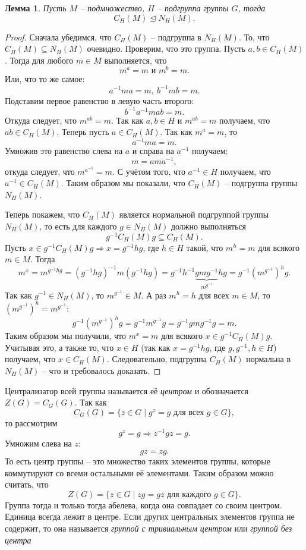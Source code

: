 \documentclass{article}
\newtheorem{lemma}{Лемма}[section]
\begin{document}
\begin{lemma} \label{vweqwqw}
    Пусть $M$ -- подмножество, $H$ -- подгруппа группы $G$, тогда $$ C_H(M) \trianglelefteq N_H(M). $$
\end{lemma}
\begin{proof}
    Сначала убедимся, что $C_H(M)$ -- подгруппа в $N_H(M)$. То, что $C_H(M) \subseteq N_H(M)$ очевидно. Проверим, что это группа. Пусть $a, b \in C_H(M)$. Тогда для любого $m \in M$ выполняется, что $$ m^a = m \text{ и } m^b = m. $$ Или, что то же самое: $$ a^{-1} m a = m, \ b^{-1} m b = m. $$ Подставим первое равенство в левую часть второго: $$ b^{-1} a^{-1} m a b = m. $$ Откуда следует, что $m^{ab} = m$. Так как $a,b \in H$ и $m^{ab} = m$ получаем, что $ab \in C_H(M)$.
    Теперь пусть $a \in C_H(M)$. Так как $m^a = m$, то $$ a^{-1} m a = m. $$ Умножив это равенство слева на $a$ и справа на $a^{-1}$ получаем: $$ m = a m a^{-1}, $$ откуда следует, что $m^{a^{-1}} = m$. С учётом того, что $a^{-1} \in H$ получаем, что $a^{-1} \in C_H(M)$. Таким образом мы показали, что $C_H(M)$ -- подгруппа группы $N_H(M)$.

    Теперь покажем, что $C_H(M)$ является нормальной подгруппой группы $N_H(M)$, то есть для каждого $g \in N_H(M)$ должно выполняться $$ g^{-1} C_H(M) g \subseteq C_H(M). $$ Пусть $x \in g^{-1} C_H(M) g \Rightarrow x = g^{-1} h g$, где $h \in H$ такой, что $m^h = m$ для всякого $m \in M$. Тогда 
    \[
        m^x = m^{g^{-1} h g} = (g^{-1} h g)^{-1} m (g^{-1} h g) = g^{-1} h^{-1} \underbrace{g m g^{-1}}_{m^{g^{-1}}} h g = g^{-1} (m^{g^{-1}})^h g.
    \]
    Так как $g^{-1}\in N_H(M)$, то $m^{g^{-1}} \in M$. А раз $m^h = h$ для всех $m \in M$, то $(m^{g^{-1}})^h = m^{g^{-1}}$:
    $$
        g^{-1} (m^{g^{-1}})^h g = g^{-1} m^{g^{-1}} g = g^{-1} g m g^{-1} g = m.
    $$
    Таким образом мы получили, что $m^x = m$ для всякого $x \in g^{-1} C_H(M) g$. Учитывая это, а также то, что $x \in H$ (так как $x = g^{-1} h g$, где $g, g^{-1}, h \in H$) получаем, что $x \in C_H(M)$. Следовательно, подгруппа $C_H(M)$ нормальна в $N_H(M)$ -- что и требовалось доказать.
\end{proof}

Централизатор всей группы называется её \textit{центром} и обозначается $Z(G) = C_G(G)$. Так как $$ C_G(G) = \{ z \in G \mid g^{z} = g \text{ для всех } g \in G \}, $$ то рассмотрим $$ g^z = g \Rightarrow z^{-1} g z = g. $$ Умножим слева на $z$: $$ gz = zg. $$ То есть центр группы -- это множество таких элементов группы, которые коммутируют со всеми остальными её элементами. Таким образом можно считать, что $$ Z(G) = \{ z \in G \mid zg = gz \text{ для каждого } g \in G \}. $$ Группа тогда и только тогда абелева, когда она совпадает со своим центром. Единица всегда лежит в центре. Если других центральных элементов группа не содержит, то она называется \textit{группой с тривиальным центром} или \textit{группой без центра}
\end{document}

